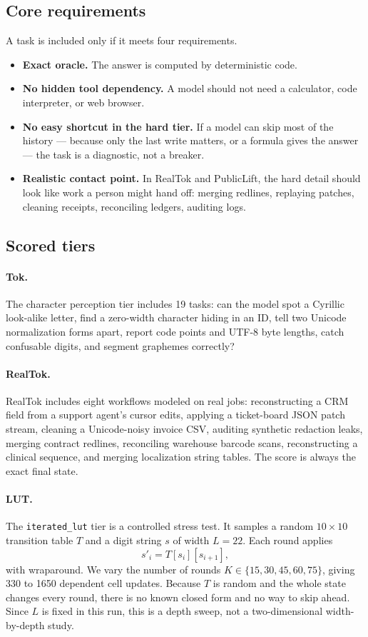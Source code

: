 \documentclass[10pt,twocolumn]{article}
\newcommand{\task}[1]{\texttt{#1}}
\begin{document}
\subsection{Core requirements}
A task is included only if it meets four requirements.
\begin{itemize}
  \item \textbf{Exact oracle.} The answer is computed by deterministic code.
  \item \textbf{No hidden tool dependency.} A model should not need a calculator, code interpreter, or web browser.
  \item \textbf{No easy shortcut in the hard tier.} If a model can skip most of the history --- because only the last write matters, or a formula gives the answer --- the task is a diagnostic, not a breaker.
  \item \textbf{Realistic contact point.} In RealTok and PublicLift, the hard detail should look like work a person might hand off: merging redlines, replaying patches, cleaning receipts, reconciling ledgers, auditing logs.
\end{itemize}

\subsection{Scored tiers}
\paragraph{Tok.}
The character perception tier includes 19 tasks: can the model spot a Cyrillic look-alike letter, find a zero-width character hiding in an ID, tell two Unicode normalization forms apart, report code points and UTF-8 byte lengths, catch confusable digits, and segment graphemes correctly?

\paragraph{RealTok.}
RealTok includes eight workflows modeled on real jobs: reconstructing a CRM field from a support agent's cursor edits, applying a ticket-board JSON patch stream, cleaning a Unicode-noisy invoice CSV, auditing synthetic redaction leaks, merging contract redlines, reconciling warehouse barcode scans, reconstructing a clinical sequence, and merging localization string tables. The score is always the exact final state.

\paragraph{LUT.}
The \task{iterated\_lut} tier is a controlled stress test. It samples a random $10\times10$ transition table $T$ and a digit string $s$ of width $L=22$. Each round applies
\[
    s'_{i} = T[s_i][s_{i+1}],
\]
with wraparound. We vary the number of rounds $K\in\{15,30,45,60,75\}$, giving 330 to 1650 dependent cell updates. Because $T$ is random and the whole state changes every round, there is no known closed form and no way to skip ahead. Since $L$ is fixed in this run, this is a depth sweep, not a two-dimensional width-by-depth study.
\end{document}
